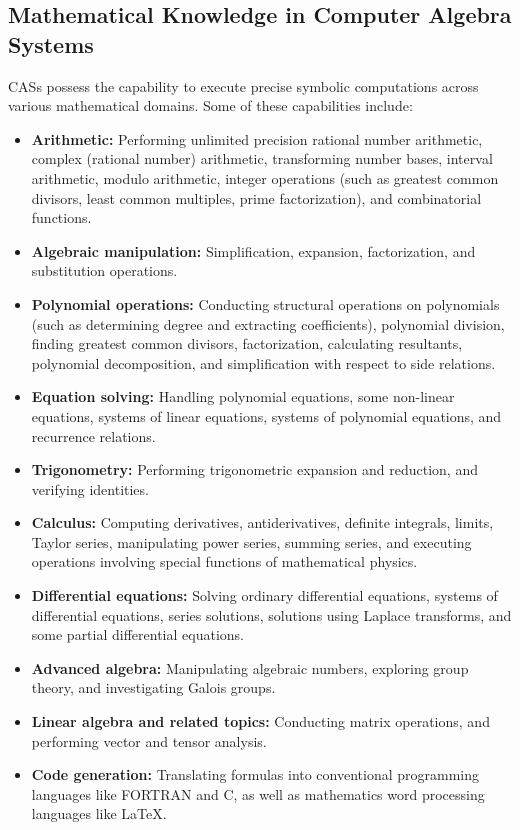 \subsection{Mathematical Knowledge in Computer Algebra Systems}

\acp{CAS} possess the capability to execute precise symbolic computations across various mathematical domains. Some of these capabilities include:
%
\begin{itemize}
  \setlength{\itemsep}{0.0em}
  \item \textbf{Arithmetic:} Performing unlimited precision rational number arithmetic, complex (rational number) arithmetic, transforming number bases, interval arithmetic, modulo arithmetic, integer operations (such as greatest common divisors, least common multiples, prime factorization), and combinatorial functions.
  \item \textbf{Algebraic manipulation:} Simplification, expansion, factorization, and substitution operations.
  \item \textbf{Polynomial operations:} Conducting structural operations on polynomials (such as determining degree and extracting coefficients), polynomial division, finding greatest common divisors, factorization, calculating resultants, polynomial decomposition, and simplification with respect to side relations.
  \item \textbf{Equation solving:} Handling polynomial equations, some non-linear equations, systems of linear equations, systems of polynomial equations, and recurrence relations.
  \item \textbf{Trigonometry:} Performing trigonometric expansion and reduction, and verifying identities.
  \item \textbf{Calculus:} Computing derivatives, antiderivatives, definite integrals, limits, Taylor series, manipulating power series, summing series, and executing operations involving special functions of mathematical physics.
  \item \textbf{Differential equations:} Solving ordinary differential equations, systems of differential equations, series solutions, solutions using Laplace transforms, and some partial differential equations.
  \item \textbf{Advanced algebra:} Manipulating algebraic numbers, exploring group theory, and investigating Galois groups.
  \item \textbf{Linear algebra and related topics:} Conducting matrix operations, and performing vector and tensor analysis.
  \item \textbf{Code generation:} Translating formulas into conventional programming languages like FORTRAN and C, as well as mathematics word processing languages like \LaTeX{}.
\end{itemize}

